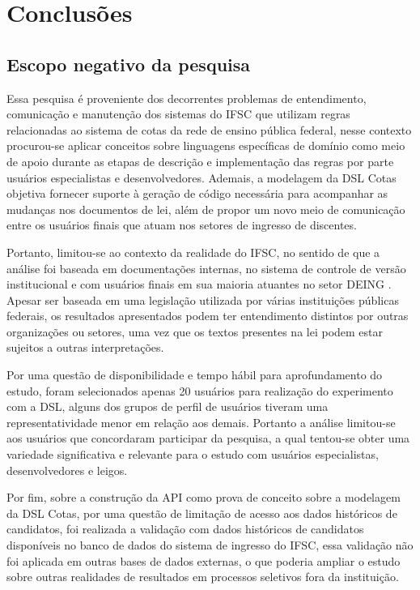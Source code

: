 \chapter{Conclusões}
\label{chap:consideracoes}



\section{Escopo negativo da pesquisa}
\label{escoponegativo}

Essa pesquisa é proveniente dos decorrentes problemas de entendimento, comunicação e manutenção dos sistemas do \gls{IFSC} que utilizam regras relacionadas ao sistema de cotas da rede de ensino pública federal, nesse contexto procurou-se aplicar conceitos sobre linguagens específicas de domínio como meio de apoio durante as etapas de descrição e implementação das regras por parte usuários especialistas e desenvolvedores. Ademais, a modelagem da DSL Cotas objetiva fornecer suporte à geração de código necessária para acompanhar as mudanças nos documentos de lei, além de propor um novo meio de comunicação entre os usuários finais que atuam nos setores de ingresso de discentes.

Portanto, limitou-se ao contexto da realidade do \gls{IFSC}, no sentido de que a análise foi baseada em documentações internas, no sistema de controle de versão institucional e com usuários finais em sua maioria atuantes no setor \gls{DEING} . Apesar ser baseada em uma legislação utilizada por várias instituições públicas federais, os resultados apresentados podem ter entendimento distintos por outras organizações ou setores, uma vez que os textos presentes na lei podem estar sujeitos a outras interpretações. 

Por uma questão de disponibilidade e tempo hábil para aprofundamento do estudo, foram selecionados apenas 20 usuários para realização do experimento com a DSL, alguns dos grupos de perfil de usuários tiveram uma representatividade menor em relação aos demais. Portanto a análise limitou-se aos usuários que concordaram participar da pesquisa, a qual tentou-se obter uma variedade significativa e relevante para o estudo com usuários especialistas, desenvolvedores e leigos.

Por fim, sobre a construção da API como prova de conceito sobre a modelagem da DSL Cotas, por uma questão de limitação de acesso aos dados históricos de candidatos, foi realizada a validação com dados históricos de candidatos disponíveis no banco de dados do sistema de ingresso do \gls{IFSC}, essa validação não foi aplicada em outras bases de dados externas, o que poderia ampliar o estudo sobre outras realidades de resultados em processos seletivos fora da instituição.

